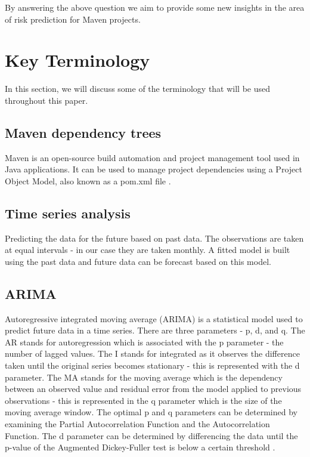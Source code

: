 \documentclass[conference]{IEEEtran}
\begin{document}
By answering the above question we aim to provide some new insights in the area of risk prediction for Maven projects. 

\section{Key Terminology}
In this section, we will discuss some of the terminology that will be used throughout this paper. \\

\subsection{Maven dependency trees}
Maven is an open-source build automation and project management tool used in Java applications. It can be used to manage project dependencies using a Project Object Model, also known as a pom.xml file \cite{noauthor_maven_nodate}. 

\subsection{Time series analysis} 
Predicting the data for the future based on past data. The observations are taken at equal intervals - in our case they are taken monthly. A fitted model is built using the past data and future data can be forecast based on this model. 

\subsection{ARIMA}
Autoregressive integrated moving average (ARIMA) is a statistical model used to predict future data in a time series. There are three parameters - p, d, and q. The AR stands for autoregression which is associated with the p parameter - the number of lagged values. The I stands for integrated as it observes the difference taken until the original series becomes stationary - this is represented with the d parameter. The MA stands for the moving average which is the dependency between an observed value and residual error from the model applied to previous observations - this is represented in the q parameter which is the size of the moving average window. The optimal p and q parameters can be determined by examining the Partial Autocorrelation Function and the Autocorrelation Function. The d parameter can be determined by differencing the data until the p-value of the Augmented Dickey-Fuller test is below a certain threshold \cite{a_a_ariyo_stock_2014}.
\end{document}
